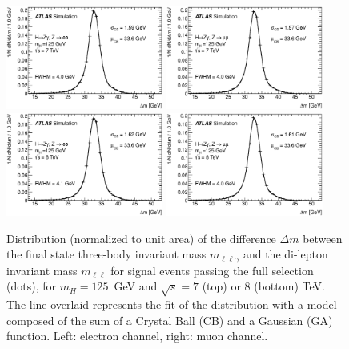 \begin{figure}[!htbp]
  \begin{center}
  {\includegraphics[width=0.46\textwidth]{figures/linPlot_125_EtaZgamma_Cat0_all_e_mc11c_mDif}}
  {\includegraphics[width=0.46\textwidth]{figures/linPlot_125_EtaZgamma_Cat0_all_mu_mc11c_mDif}}
  {\includegraphics[width=0.46\textwidth]{figures/linPlot_125_EtaZgamma_Cat0_all_e_mc12a_mDif}}
  {\includegraphics[width=0.46\textwidth]{figures/linPlot_125_EtaZgamma_Cat0_all_mu_mc12a_mDif}}
    \caption{Distribution (normalized to unit area) of the difference $\Delta m$ 
      between the final state three-body invariant mass
      $m_{\ell\ell\gamma}$ and the di-lepton invariant mass
      $m_{\ell\ell}$ for signal events
      passing the full selection (dots), for $m_H = 125$~GeV and $\sqrt{s}=7$ (top) or 8 (bottom) TeV. 
      The line overlaid represents the fit of the distribution with a
      model composed of the sum of a Crystal Ball (CB) and a Gaussian (GA) function.
      Left: electron channel, right: muon channel. 
    }
    \label{fig:resolution_model_example_8tev_H125}
  \end{center}
\end{figure}
 
